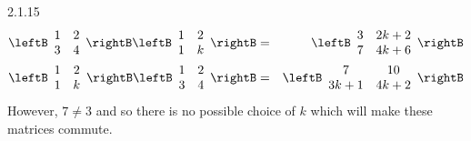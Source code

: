 \begin{Answer}{2.1.15}
\begin{eqnarray*}
\leftB
\begin{array}{cc}
1 & 2 \\
3 & 4
\end{array}
\rightB \leftB
\begin{array}{cc}
1 & 2 \\
1 & k
\end{array}
\rightB &=& \leftB
\begin{array}{cc}
3 & 2k+2 \\
7 & 4k+6
\end{array}
\rightB \\
\leftB
\begin{array}{cc}
1 & 2 \\
1 & k
\end{array}
\rightB \leftB
\begin{array}{cc}
1 & 2 \\
3 & 4
\end{array}
\rightB &=& \leftB
\begin{array}{cc}
7 & 10 \\
3k+1 & 4k+2
\end{array}
\rightB
\end{eqnarray*}
 However, $7\neq 3$ and so there is no possible choice of $k$ which
will make these matrices commute.
\end{Answer}
